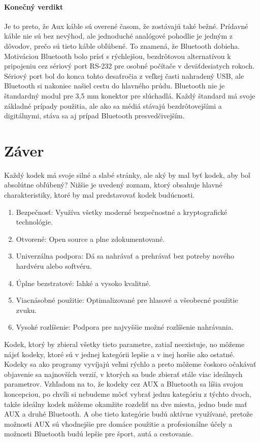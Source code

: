 \documentclass[10pt,twoside,slovak,a4paper]{article}
\begin{document}
\paragraph{Konečný verdikt} \label{verdikt} 

Je to preto, že Aux káble sú overené časom, že zostávajú také bežné. Prídavné káble nie sú bez nevýhod, ale jednoduché analógové pohodlie je jedným z dôvodov, prečo sú tieto káble obľúbené. To znamená, že Bluetooth dobieha.
Motiváciou Bluetooth bolo prísť s rýchlejšou, bezdrôtovou alternatívou k pripojeniu cez sériový port RS-232 pre osobné počítače v deväťdesiatych rokoch. Sériový port bol do konca tohto desaťročia z veľkej časti nahradený USB, ale Bluetooth si nakoniec našiel cestu do hlavného prúdu.
Bluetooth nie je štandardný modul pre 3,5 mm konektor pre slúchadlá. Každý štandard má svoje základné prípady použitia, ale ako sa médiá stávajú bezdrôtovejšími a digitálnymi, stáva sa aj prípad Bluetooth presvedčivejším.\cite{Laukkonen}

\section{Záver} \label{zaver} 

Každý kodek má svoje silné a slabé stránky, ale aký by mal byť kodek, aby bol absolútne obľúbený? Nižšie je uvedený zoznam, ktorý obsahuje hlavné charakteristiky, ktoré by mal predstavovať kodek budúcnosti. 

\begin {enumerate}
\item Bezpečnosť: Využíva všetky moderné bezpečnostné a kryptografické technológie.\cite{Stephens}
\item Otvorené: Open source a plne zdokumentované.\cite{Stephens}
\item Univerzálna podpora: Dá sa nahrávať a prehrávať bez potreby nového hardvéru alebo softvéru.\cite{Stephens}
\item Úplne bezstratové: ľahké a vysoko kvalitné.\cite{Stephens}
\item Viacnásobné použitie: Optimalizované pre hlasové a všeobecné použitie zvuku.\cite{Stephens}
\item Vysoké rozlíšenie: Podpora pre najvyššie možné rozlíšenie nahrávania.\cite{Stephens}
\end {enumerate}

Kodek, ktorý by zbieral všetky tieto parametre, zatiaľ neexistuje, no môžeme nájsť kodeky, ktoré sú v jednej kategórii lepšie a v inej horšie ako ostatné. Kodeky sa ako programy vyvíjajú veľmi rýchlo a preto môžeme čoskoro očakávať objavenie sa najnovších verzií, v ktorých sa bude zbierať stále viac ideálnych parametrov. Vzhľadom na to, že kodeky cez AUX a Bluetooth sa líšia svojou koncepciou, po chvíli si nebudeme môcť vybrať jednu kategóriu z týchto dvoch, takže ideálny kodek môžeme okamžite rozdeliť na dve miesta, jedno bude mať AUX a druhé Bluetooth. A obe tieto kategórie budú aktívne využívané, pretože možnosti AUX sú vhodnejšie pre domáce použitie a profesionálne účely a možnosti Bluetooth budú lepšie pre šport, autá a cestovanie.
\end{document}
